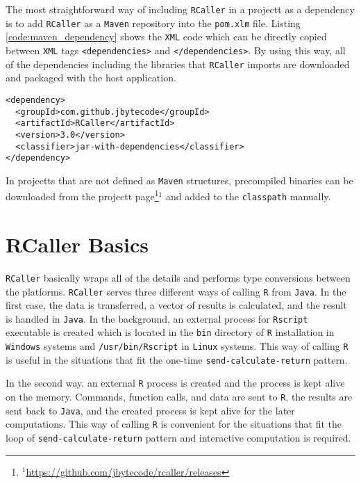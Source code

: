 \documentclass[10pt,a4paper, final, oneside]{article}
\begin{document}
The most straightforward way of including \texttt{RCaller} in a projectt as a dependency is to add \texttt{RCaller} as a \texttt{Maven} repository into the \texttt{pom.xlm} file. Listing \ref{code:maven_dependency} shows the \texttt{XML} code which can be directly copied between \texttt{XML} tags \texttt{<dependencies>} and \texttt{</dependencies>}. By using this way, all of the dependencies including the libraries that \texttt{RCaller} imports are downloaded and packaged with the host application.  


\begin{minipage}{\linewidth}
\begin{lstlisting}[caption=Maven dependency code, label=code:maven_dependency]
<dependency>
  <groupId>com.github.jbytecode</groupId>
  <artifactId>RCaller</artifactId>
  <version>3.0</version>
  <classifier>jar-with-dependencies</classifier>
</dependency>
\end{lstlisting}
\end{minipage}

In projectts that are not defined as \texttt{Maven} structures, precompiled binaries can be downloaded from the projectt page\footnote{$^1$\url{https://github.com/jbytecode/rcaller/releases}}$^1$ and added to the \texttt{classpath} manually. 

\section{RCaller Basics}
\label{sec:rcaller_basics}

\texttt{RCaller} basically wraps all of the details and performs type conversions between the platforms. \texttt{RCaller} serves three different ways of calling \texttt{R} from \texttt{Java}. In the first case, the data is transferred, a vector of results is calculated, and the result is handled in \texttt{Java}. In the background, an external process for \texttt{Rscript} executable is created which is located in the \texttt{bin} directory of \texttt{R} installation in \texttt{Windows} systems and \texttt{/usr/bin/Rscript} in \texttt{Linux} systems. This way of calling \texttt{R} is useful in the situations that fit the one-time \texttt{send-calculate-return} pattern.

In the second way, an external \texttt{R} process is created and the process is kept alive on the memory. Commands, function calls, and data are sent to \texttt{R}, the results are sent back to \texttt{Java}, and the created process is kept alive for the later computations. This way of calling \texttt{R} is convenient for the situations that fit the loop of \texttt{send-calculate-return} pattern and interactive computation is required. 
\end{document}

